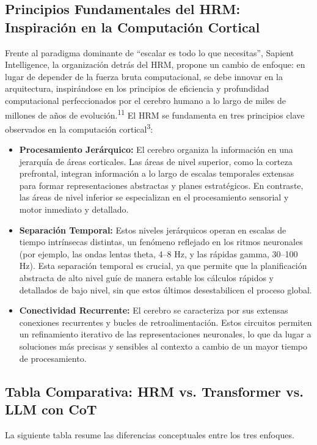 \documentclass{article}
\begin{document}
	\subsection{Principios Fundamentales del HRM: Inspiración en la Computación Cortical}
	Frente al paradigma dominante de ``escalar es todo lo que necesitas'', Sapient Intelligence, la organización detrás del HRM, propone un cambio de enfoque: en lugar de depender de la fuerza bruta computacional, se debe innovar en la arquitectura, inspirándose en los principios de eficiencia y profundidad computacional perfeccionados por el cerebro humano a lo largo de miles de millones de años de evolución.\textsuperscript{11} El HRM se fundamenta en tres principios clave observados en la computación cortical\textsuperscript{3}:
	\begin{itemize}
		\item \textbf{Procesamiento Jerárquico:} El cerebro organiza la información en una jerarquía de áreas corticales. Las áreas de nivel superior, como la corteza prefrontal, integran información a lo largo de escalas temporales extensas para formar representaciones abstractas y planes estratégicos. En contraste, las áreas de nivel inferior se especializan en el procesamiento sensorial y motor inmediato y detallado.
		\item \textbf{Separación Temporal:} Estos niveles jerárquicos operan en escalas de tiempo intrínsecas distintas, un fenómeno reflejado en los ritmos neuronales (por ejemplo, las ondas lentas theta, 4–8 Hz, y las rápidas gamma, 30–100 Hz). Esta separación temporal es crucial, ya que permite que la planificación abstracta de alto nivel guíe de manera estable los cálculos rápidos y detallados de bajo nivel, sin que estos últimos desestabilicen el proceso global.
		\item \textbf{Conectividad Recurrente:} El cerebro se caracteriza por sus extensas conexiones recurrentes y bucles de retroalimentación. Estos circuitos permiten un refinamiento iterativo de las representaciones neuronales, lo que da lugar a soluciones más precisas y sensibles al contexto a cambio de un mayor tiempo de procesamiento.
	\end{itemize}
	
	\subsection{Tabla Comparativa: HRM vs. Transformer vs. LLM con CoT}
	La siguiente tabla resume las diferencias conceptuales entre los tres enfoques.
	
\end{document}
